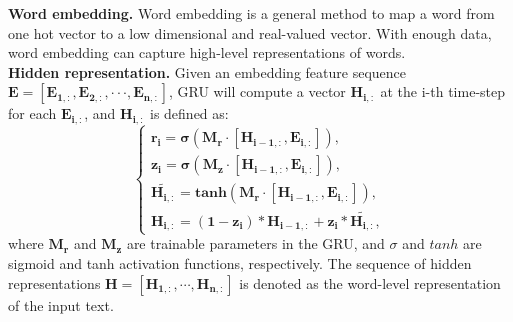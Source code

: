 \documentclass[letterpaper]{article} \usepackage{aaai19}  \usepackage{times}  \usepackage{helvet}  \usepackage{courier}  \usepackage{url}  \usepackage{graphicx}
\begin{document}
\noindent \textbf{Word embedding.}
Word embedding is a general method to map a word from one hot vector to a low dimensional and real-valued vector. With enough data, word embedding can capture high-level representations of words.
\\
\textbf{Hidden representation.}
Given an embedding feature sequence $\mathbf{E = [E_{1,:}, E_{2,:}, \cdot \cdot \cdot, E_{n,:}] }$, GRU will compute a vector $\mathbf{H_{i,:}}$ at the i-th time-step for each $\mathbf{E_{i,:}}$, and  $\mathbf{H_{i,:}}$ is defined as:
\begin{equation}
\left\{
\begin{array}{lr}
\mathbf{r_{i} = \sigma(M_{r}\cdot[H_{i-1,:},E_{i,:}])},\\
\mathbf{z_{i} = \sigma(M_{z}\cdot[H_{i-1,:},E_{i,:}])},\\
\mathbf{\widetilde{H_{i,:}} = tanh(M_{r}\cdot[H_{i-1,:},E_{i,:}])},\\
\mathbf{H_{i,:} = (1-z_{i})*H_{i-1,:}+z_{i}*\widetilde{H_{i,:}}},
\end{array}
\right.
\end{equation}
where $\mathbf{M_{r}}$ and $\mathbf{M_{z}}$ are trainable parameters in the GRU, and $\sigma$ and $tanh$ are sigmoid and tanh activation functions, respectively.
The sequence of hidden representations $\mathbf{H = [H_{1,:}, \cdots, H_{n,:}]}$ is denoted as the word-level representation of the input text.
\end{document}
